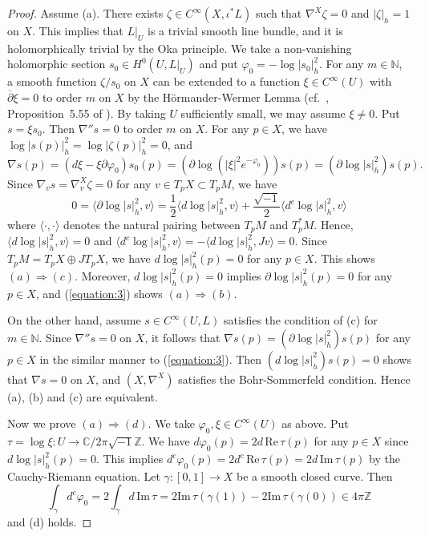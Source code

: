\documentclass[12pt,oneside]{amsart}
\theoremstyle{plain}
\theoremstyle{definition}
\theoremstyle{remark}
\begin{document}
\begin{proof}
Assume (a).  
There exists $\zeta \in C^{\infty}(X, \iota^{*}L)$ such that $\nabla^{X} \zeta = 0$ and $|\zeta|_{h} =1$ on $X$.  
This implies that $L|_{U}$ is a trivial smooth line bundle, and it is holomorphically trivial by the Oka principle.  
We take a non-vanishing holomorphic section $s_{0} \in H^0(U, L|_{U})$ 
and put $\varphi_{0} = - \log |s_{0}|^2_{h}$.  
For any $m \in \mathbb{N}$, a smooth function $\zeta/s_{0}$ on $X$ can be extended to a function $\xi \in C^{\infty}(U)$ with $\overline{\partial} \xi = 0$ to order $m$ on $X$ by the H\"ormander-Wermer Lemma (cf.~\cite{Hor-Wer}, Proposition~5.55 of \cite{Cie-Eli}).    
By taking $U$ sufficiently small, we may assume $\xi \neq 0$.  
Put $s = \xi s_{0}$.  
Then $\nabla'' s = 0$ to order $m$ on $X$.  
For any $p \in X$, we have $\log |s(p)|_{h}^2 = \log |\zeta(p)|^2_{h} = 0$, and 
\begin{equation}\label{equation:3}
\nabla s(p) = (d \xi - \xi \partial \varphi_{0})s_{0}(p) = (\partial \log (|\xi|^2e^{-\varphi_{0}}))s(p) = (\partial \log |s|^2_{h})s(p).  
\end{equation}
Since $\nabla_{v}s = \nabla^{X}_{v}\zeta = 0$ for any $v \in T_{p}X \subset T_pM$, 
we have 
\[
0 = \langle \partial \log |s|^2_{h}, v \rangle = \frac{1}{2} \langle d \log |s|^2_{h}, v \rangle + \frac{\sqrt{-1}}{2} \langle d^c \log |s|^2_{h}, v\rangle 
\]
where $\langle \cdot, \cdot \rangle$ denotes the natural pairing between $T_{p}M$ and $T^{*}_{p}M$.  
Hence, $\langle d \log |s|_h^2, v \rangle = 0$ and $\langle d^c \log |s|_h^2, v\rangle = -\langle d \log |s|_{h}^2, Jv \rangle = 0$.  
Since $T_{p}M = T_{p}X \oplus JT_{p}X$, we have  
$d \log |s|^2_{h}(p) = 0$ for any $p \in X$.  
This shows $(a) \Rightarrow (c)$.  
Moreover, $d \log |s|^2_{h}(p) = 0$ implies 
$\partial \log |s|^2_{h}(p) = 0$ for any $p \in X$, and (\ref{equation:3}) shows 
$(a) \Rightarrow (b)$.  

On the other hand, assume $s \in C^{\infty}(U, L)$ satisfies the condition of (c) for $m \in \mathbb{N}$.  
Since $\nabla''s = 0$ on $X$, 
it follows that $\nabla s (p) = (\partial \log |s|_{h}^2) s(p)$ for any $p \in X$ in the similar manner to (\ref{equation:3}).  
Then $(d \log |s|_{h}^2) s(p) = 0$ shows that $\nabla s = 0$ on $X$, 
and $(X, \nabla^{X})$ satisfies the Bohr-Sommerfeld condition.  
Hence (a), (b) and (c) are equivalent.  

Now we prove $(a) \Rightarrow (d)$.  
We take $\varphi_{0}, \xi \in C^{\infty}(U)$ as above.  
Put $\tau = \log \xi: U \to \mathbb{C}/ 2\pi \sqrt{-1} \mathbb{Z}$.  
We have $d\varphi_{0}(p) = 2d \, \mathrm{Re}\,\tau(p)$ for any $p \in X$ since $d\log |s|^2_{h}(p) = 0$.   
This implies $d^c \varphi_{0}(p) = 2d^c \,\mathrm{Re}\,\tau(p) = 2d\, \mathrm{Im}\,\tau (p)$ 
by the Cauchy-Riemann equation.  
Let $\gamma:[0, 1] \to X$ be a smooth closed curve.  
Then 
\[
\int_{\gamma} d^c \varphi_{0} = 2\int_{\gamma} d\, \mathrm{Im}\, \tau = 2\mathrm{Im}\,\tau(\gamma(1))-2\mathrm{Im}\, \tau(\gamma(0)) \in 4\pi \mathbb{Z}
\]
and (d) holds.  


\end{proof}
\end{document}
